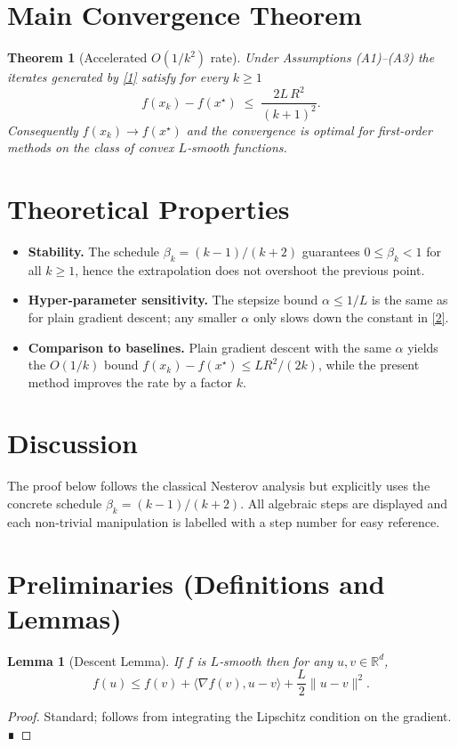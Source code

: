 \documentclass{article}
\newtheorem{theorem}{Theorem}
\newtheorem{lemma}{Lemma}
\newcommand{\grad}{\nabla}
\newcommand{\R}{\mathbb{R}}
\begin{document}
\section*{Main Convergence Theorem}
\begin{theorem}[Accelerated $O(1/k^{2})$ rate]\label{thm:rate}
Under Assumptions (A1)–(A3) the iterates generated by
\eqref{1} satisfy for every $k\ge 1$
\[
f(x_k)-f(x^\star)\;\le\;
\frac{2L\,R^{2}}{(k+1)^{2}} .
\tag{2}
\]
Consequently $f(x_k)\to f(x^\star)$ and the convergence
is optimal for first‑order methods on the class of convex $L$‑smooth
functions.
\end{theorem}

\section*{Theoretical Properties}
\begin{itemize}
\item \textbf{Stability.} The schedule
$\beta_k=(k-1)/(k+2)$ guarantees $0\le\beta_k<1$ for all $k\ge1$,
hence the extrapolation does not overshoot the previous point.
\item \textbf{Hyper‑parameter sensitivity.}
The stepsize bound $\alpha\le1/L$ is the same as for plain gradient
descent; any smaller $\alpha$ only slows down the constant in \eqref{2}.
\item \textbf{Comparison to baselines.}
Plain gradient descent with the same $\alpha$ yields the
$O(1/k)$ bound $f(x_k)-f(x^\star)\le L R^{2}/(2k)$,
while the present method improves the rate by a factor $k$.
\end{itemize}

\section*{Discussion}
The proof below follows the classical Nesterov analysis but
explicitly uses the concrete schedule $\beta_k=(k-1)/(k+2)$.
All algebraic steps are displayed and each non‑trivial manipulation
is labelled with a step number for easy reference.

\section*{Preliminaries (Definitions and Lemmas)}
\begin{lemma}[Descent Lemma]\label{lem:descent}
If $f$ is $L$‑smooth then for any $u,v\in\R^d$,
\[
f(u)\le f(v)+\langle\grad f(v),u-v\rangle+\frac{L}{2}\|u-v\|^{2}.
\tag{L1}
\]
\end{lemma}
\begin{proof}
Standard; follows from integrating the Lipschitz condition on the
gradient. ∎
\end{proof}
\end{document}
